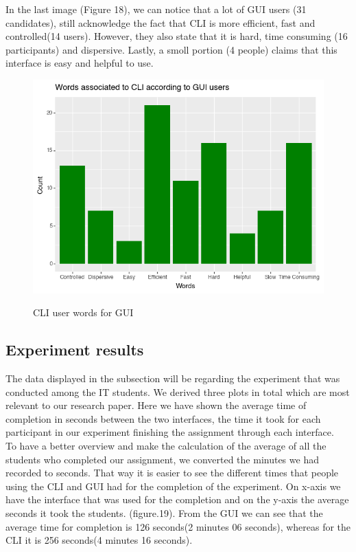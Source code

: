 \documentclass[]{report}
\begin{document}
	In the last image (Figure 18), we can notice that a lot of GUI users (31 candidates), still acknowledge the fact that CLI is more efficient, fast and controlled(14 users). However, they also state that it is hard, time consuming (16 participants) and dispersive. Lastly, a smoll portion (4 people) claims that this interface is easy and helpful to use.
	
	
	\begin{figure}[H]
		\centering
		\includegraphics[width=0.75\linewidth]{WordsCLIFromGUI}\\
		\caption{CLI user words for GUI}
		\label{fig: 18}
	\end{figure}
\newpage
\subsection{Experiment results}
The data displayed in the subsection will be regarding the experiment that was conducted among the IT students. We derived three plots in total which are most relevant to our research paper. Here we have shown the average time of completion in seconds between the two interfaces, the time it took for each participant in our experiment finishing the assignment through each interface.\\
		
	To have a better overview and make the calculation of the average of all the students who completed our assignment, we converted the minutes we had recorded to seconds. That way it is easier to see the different times that people using the CLI and GUI had for the completion of the experiment. On x-axis we have the interface that was used for the completion and on the y-axis the average seconds it took the students. (figure.19). From the GUI we can see that the average time for completion is 126 seconds(2 minutes 06 seconds), whereas for the CLI it is 256 seconds(4 minutes 16 seconds).
\end{document}
